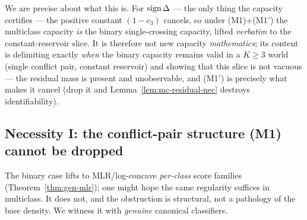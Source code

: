 \noindent We are precise about what this is. For $\operatorname{sign}\Delta$ --- the only thing the capacity
certifies --- the positive constant $(1-c_3)$ cancels, so under (M1)+(M1$'$) the multiclass capacity
\emph{is} the binary single-crossing capacity, lifted \emph{verbatim} to the constant-reservoir
slice. It is therefore not new capacity \emph{mathematics}; its content is delimiting exactly
\emph{when} the binary capacity remains valid in a $K\ge3$ world (single conflict pair, constant
reservoir) and showing that this slice is not vacuous --- the residual mass is present and
unobservable, and (M1$'$) is precisely what makes it cancel (drop it and
Lemma~\ref{lem:mc-residual-nec} destroys identifiability).

\subsection{Necessity I: the conflict-pair structure (M1) cannot be dropped}
\label{sec:mc-breakerM1}
The binary case lifts to MLR/log-concave \emph{per-class} score families
(Theorem~\ref{thm:gen-mlr}); one might hope the same regularity suffices in multiclass.
It does not, and the obstruction is structural, not a pathology of the base density. We
witness it with \emph{genuine} canonical classifiers.

